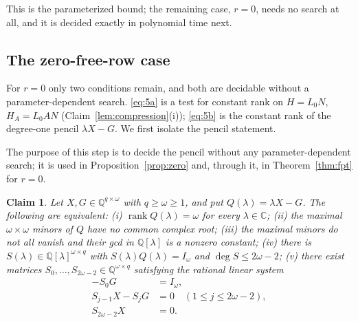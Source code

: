 \documentclass[journal]{IEEEtran}
\theoremstyle{plainn}
\newtheorem{claim}{Claim}
\theoremstyle{remark}
\begin{document}
This is the parameterized bound; the remaining case, $r=0$, needs no search at all, and it is decided
exactly in polynomial time next.

\subsection{The zero-free-row case}\label{sec:zero}

For $r=0$ only two conditions remain, and both are decidable without a
parameter-dependent search. \eqref{eq:5a} is a test for constant rank on
$H=L_0N$, $H_A=L_0AN$ (Claim~\ref{lem:compression}(i)); \eqref{eq:5b} is the
constant rank of the degree-one pencil $\lambda X-G$. We first isolate
the pencil statement.

The purpose of this step is to decide the pencil without any parameter-dependent search; it is used in Proposition~\ref{prop:zero} and, through it, in Theorem~\ref{thm:fpt} for $r=0$.

\begin{claim}\label{lem:zero}
Let $X,G\in\mathbb Q^{q\times\omega}$ with $q\ge\omega\ge1$, and put
$Q(\lambda)=\lambda X-G$. The following are equivalent:
\emph{(i)} $\operatorname{rank}Q(\lambda)=\omega$ for every
$\lambda\in\mathbb C$;
\emph{(ii)} the maximal $\omega\times\omega$ minors of $Q$ have no common
complex root;
\emph{(iii)} the maximal minors do not all vanish and their gcd in
$\mathbb Q[\lambda]$ is a nonzero constant;
\emph{(iv)} there is $S(\lambda)\in\mathbb Q[\lambda]^{\omega\times q}$ with
$S(\lambda)Q(\lambda)=I_\omega$ and $\deg S\le2\omega-2$;
\emph{(v)} there exist matrices
$S_0,\dots,S_{2\omega-2}\in\mathbb Q^{\omega\times q}$ satisfying the rational
linear system
\begin{equation}\label{eq:R0}
\begin{aligned}
-S_0G&=I_\omega,\\
S_{j-1}X-S_jG&=0\quad(1\le j\le2\omega-2),\\
S_{2\omega-2}X&=0 .
\end{aligned}
\end{equation}
\end{claim}
\end{document}
